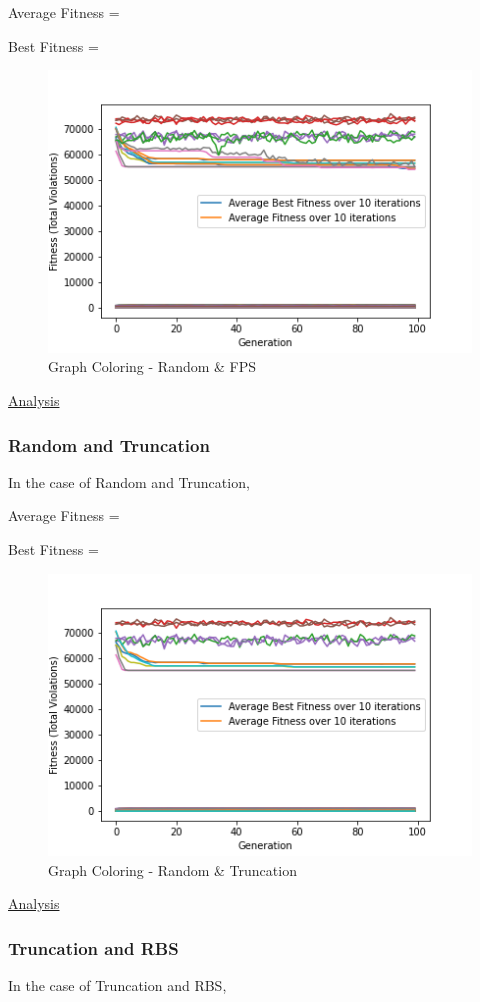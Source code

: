 \documentclass[11pt, letterpaper]{article}
\begin{document}
Average Fitness = 

Best Fitness = 
\begin{figure}[H]
    \centering
    \includegraphics[scale = 0.6]{images/graphcoloring_rd_fp.png}
    \caption {Graph Coloring - Random \& FPS}
    \label {fig:gcRB}
\end{figure}

\underline{Analysis}

\subsubsection {Random and Truncation}
In the case of Random and Truncation,

Average Fitness = 

Best Fitness = 
\begin{figure}[H]
    \centering
    \includegraphics[scale = 0.6]{images/graphcoloring_rd_tr.png}
    \caption {Graph Coloring - Random \& Truncation}
    \label {fig:gcRT}
\end{figure}

\underline{Analysis}
\subsubsection {Truncation and RBS}
In the case of Truncation and RBS,
\end{document}
